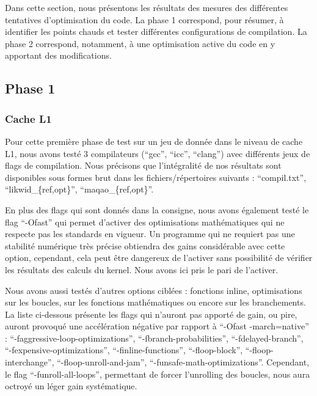 \documentclass[12pt,a4paper]{article}
\begin{document}
Dans cette section, nous présentons les résultats des mesures des différentes
tentatives d'optimisation du code. La phase 1 correspond, pour résumer, à
identifier les points chauds et tester différentes configurations de compilation.
La phase 2 correspond, notamment, à une optimisation active du code en y apportant
des modifications.

\subsection{Phase 1}

\subsubsection{Cache L1}

Pour cette première phase de test sur un jeu de donnée dans le niveau de cache
L1, nous avons testé 3 compilateurs (\enquote{gcc}, \enquote{icc},
\enquote{clang}) avec différents jeux de flags de compilation. Nous précisons que
l'intégralité de nos résultats sont disponibles sous formes brut dans les
fichiers/répertoires suivants : \enquote{compil.txt},
\enquote{likwid\_\{ref,opt\}}, \enquote{maqao\_\{ref,opt\}}.

En plus des flags qui sont donnés dans la consigne, nous avons également testé
le flag \enquote{-Ofast} qui permet d'activer des optimisations mathématiques qui
ne respecte pas les standards en vigueur. Un programme qui ne requiert pas une
stabilité numérique très précise obtiendra des gains considérable avec cette
option, cependant, cela peut être dangereux de l'activer sans possibilité de
vérifier les résultats des calculs du kernel. Nous avons ici pris le pari de
l'activer.

Nous avons aussi testés d'autres options ciblées :
fonctions inline, optimisations sur les boucles, sur les fonctions
mathématiques ou encore sur les branchements. La liste ci-dessous présente
les flags qui n'auront pas apporté de gain, ou pire, auront provoqué une accélération
négative par rapport à \enquote{-Ofast -march=native} :
\enquote{-faggressive-loop-optimizations}, \enquote{-fbranch-probabilities},
\enquote{-fdelayed-branch}, \enquote{-fexpensive-optimizations},
\enquote{-finline-functions}, \enquote{-floop-block},
\enquote{-floop-interchange}, \enquote{-floop-unroll-and-jam},
\enquote{-funsafe-math-optimizations}. Cependant, le flag
\enquote{-funroll-all-loops}, permettant de forcer l'unrolling des boucles, nous
aura octroyé un léger gain systématique.
\end{document}
